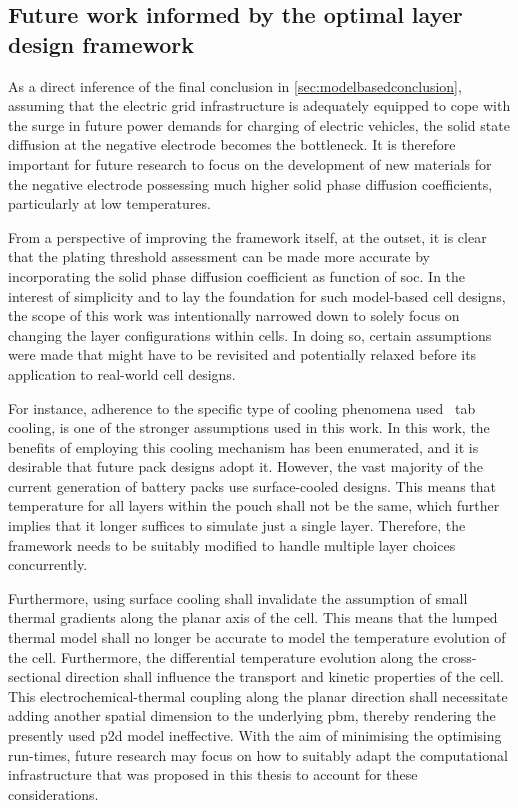 \subsection{Future work informed by  the optimal layer design framework}

As     a     direct     inference     of     the     final     conclusion     in
\cref{sec:modelbasedconclusion}, assuming that  the electric grid infrastructure
is  adequately equipped  to cope  with  the surge  in future  power demands  for
charging  of  electric vehicles,  the  solid  state  diffusion at  the  negative
electrode becomes the bottleneck. It  is therefore important for future research
to  focus  on the  development  of  new  materials  for the  negative  electrode
possessing much higher  solid phase diffusion coefficients,  particularly at low
temperatures.

From a perspective of improving the framework itself, at the outset, it is clear
that the plating threshold assessment can be made more accurate by incorporating
the solid phase diffusion coefficient as  function of \gls{soc}. In the interest
of simplicity and  to lay the foundation for such  model-based cell designs, the
scope of this  work was intentionally narrowed down to  solely focus on changing
the layer  configurations within  cells. In doing  so, certain  assumptions were
made  that  might have  to  be  revisited  and  potentially relaxed  before  its
application to real-world cell designs.

For instance, adherence  to the specific type of cooling  phenomena used \ie~tab
cooling, is one of the stronger assumptions used in this work. In this work, the
benefits of  employing this  cooling mechanism  has been  enumerated, and  it is
desirable that future  pack designs adopt it. However, the  vast majority of the
current generation of battery packs  use surface-cooled designs. This means that
temperature for all layers within the pouch shall not be the same, which further
implies that it longer suffices to  simulate just a single layer. Therefore, the
framework  needs  to be  suitably  modified  to  handle multiple  layer  choices
concurrently.

Furthermore,  using surface  cooling shall  invalidate the  assumption of  small
thermal gradients along the planar axis of  the cell. This means that the lumped
thermal model  shall no longer  be accurate  to model the  temperature evolution
of  the cell.  Furthermore,  the differential  temperature  evolution along  the
cross-sectional direction  shall influence the transport  and kinetic properties
of the  cell. This electrochemical-thermal  coupling along the  planar direction
shall necessitate adding another spatial  dimension to the underlying \gls{pbm},
thereby rendering the  presently used \gls{p2d} model ineffective.  With the aim
of minimising  the optimising  run-times, future  research may  focus on  how to
suitably adapt the computational infrastructure that was proposed in this thesis
to account for these considerations.

